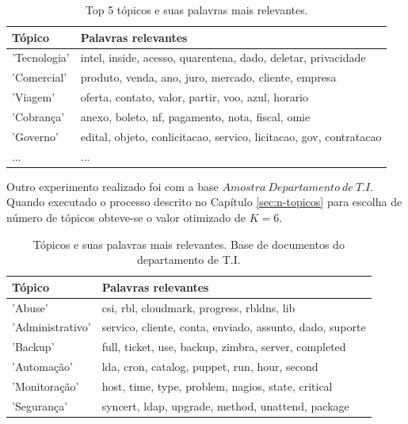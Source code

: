 \documentclass[12pt,a4paper]{article}
\begin{document}
\begin{table}[H]
  \centering
  \begin{tabular}{ll}
  Tópico                   & Palavras relevantes \\
  \hline
  'Tecnologia'               & intel, inside, acesso, quarentena, dado, deletar, privacidade \\
  'Comercial'                & produto, venda, ano, juro, mercado, cliente, empresa \\
  'Viagem'                   & oferta, contato, valor, partir, voo, azul, horario \\
  'Cobrança'                 & anexo, boleto, nf, pagamento, nota, fiscal, omie \\
  'Governo'                  & edital, objeto, conlicitacao, servico, licitacao, gov, contratacao \\
  ...                        & ... \\
  \hline
  \end{tabular}
  \caption{Top 5 tópicos e suas palavras mais relevantes.}
  \label{tab-global-topics}
\end{table}


Outro experimento realizado foi com a base $Amostra\ Departamento\ de\ T.I$. Quando executado o processo descrito no Capítulo \ref{sec:n-topicos} para escolha de número de tópicos obteve-se o valor otimizado de $K=6$.

\begin{table}[H]
  \centering
  \begin{tabular}{ll}
  Tópico                   & Palavras relevantes \\
  \hline
  'Abuse'                    & csi, rbl, cloudmark, progress, rbldns, lib \\
  'Administrativo'           & servico, cliente, conta, enviado, assunto, dado, suporte \\
  'Backup'                   & full, ticket, use, backup, zimbra, server, completed  \\
  'Automação'                & lda, cron, catalog, puppet, run, hour, second \\
  'Monitoração'              & host, time, type, problem, nagios, state, critical \\
  'Segurança'                & syncert, ldap, upgrade, method, unattend, package \\
  \hline
  \end{tabular}
  \caption{Tópicos e suas palavras mais relevantes. Base de documentos do departamento de T.I.}
  \label{tab-nich-topics}
\end{table}
\end{document}
